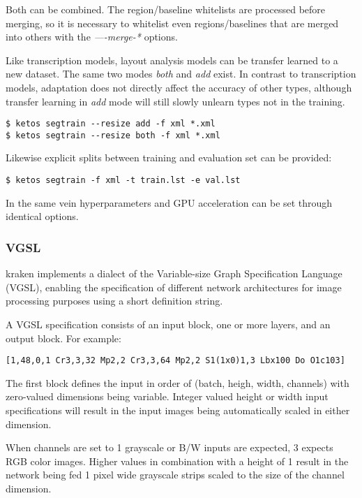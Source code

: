 Both can be combined. The region/baseline whitelists are processed before
merging, so it is necessary to whitelist even regions/baselines that are merged
into others with the \emph{----merge-*} options.

Like transcription models, layout analysis models can be transfer learned to a
new dataset. The same two modes \emph{both} and \emph{add} exist. In contrast
to transcription models, adaptation does not directly affect the accuracy of
other types, although transfer learning in \emph{add} mode will still slowly
unlearn types not in the training.

\begin{verbatim}
$ ketos segtrain --resize add -f xml *.xml
$ ketos segtrain --resize both -f xml *.xml
\end{verbatim}

Likewise explicit splits between training and evaluation set can be provided:

\begin{verbatim}
$ ketos segtrain -f xml -t train.lst -e val.lst
\end{verbatim}

In the same vein hyperparameters and GPU acceleration can be set through
identical options.

\subsubsection{VGSL}
\label{vgsl}
kraken implements a dialect of the Variable-size Graph Specification Language
(VGSL), enabling the specification of different network architectures for image
processing purposes using a short definition string.

A VGSL specification consists of an input block, one or more layers, and an
output block. For example:

\begin{verbatim}
[1,48,0,1 Cr3,3,32 Mp2,2 Cr3,3,64 Mp2,2 S1(1x0)1,3 Lbx100 Do O1c103]
\end{verbatim}

The first block defines the input in order of (batch, heigh, width, channels)
with zero-valued dimensions being variable. Integer valued height or width
input specifications will result in the input images being automatically scaled
in either dimension.

When channels are set to 1 grayscale or B/W inputs are expected, 3 expects RGB
color images. Higher values in combination with a height of 1 result in the
network being fed 1 pixel wide grayscale strips scaled to the size of the
channel dimension.

